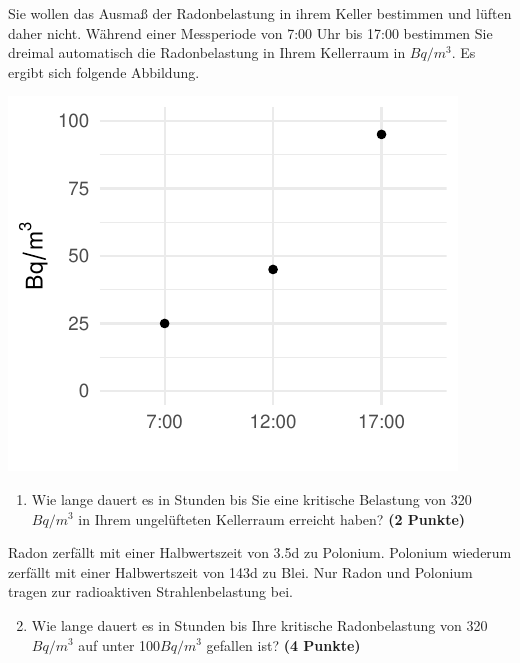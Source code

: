 \documentclass[a4paper, 9pt]{scrartcl}\usepackage[]{graphicx}\usepackage[]{xcolor}
\makeatletter
\def\maxwidth{ %
  \ifdim\Gin@nat@width>\linewidth
    \linewidth
  \else
    \Gin@nat@width
  \fi
}
\newenvironment{knitrout}{}{} %
\makeatother
\begin{document}
Sie wollen das Ausma{\ss} der Radonbelastung in ihrem Keller bestimmen und
l{\"u}ften daher nicht. W{\"a}hrend einer Messperiode von 7:00 Uhr bis
17:00 bestimmen Sie dreimal automatisch die Radonbelastung in
Ihrem Kellerraum in $Bq/m^3$. Es ergibt sich folgende Abbildung.

\begin{knitrout}
\color{fgcolor}

{\centering \includegraphics[width=\maxwidth]{img/math-10-1} 

}


\end{knitrout}

\vspace{-0.75cm}

\begin{enumerate}
\item Wie lange dauert es in Stunden bis Sie eine kritische Belastung von
  320$Bq/m^3$ in Ihrem ungel{\"u}fteten Kellerraum erreicht haben?
  \textbf{(2 Punkte)}
\end{enumerate}

Radon zerf{\"a}llt mit einer Halbwertszeit von 3.5d zu
Polonium. Polonium wiederum zerf{\"a}llt mit einer Halbwertszeit von
143d zu Blei. Nur Radon und Polonium tragen zur
radioaktiven Strahlenbelastung bei.

\begin{enumerate}
  \setcounter{enumi}{1}
\item Wie lange dauert es in Stunden bis Ihre kritische Radonbelastung von
  320$Bq/m^3$ auf unter 100$Bq/m^3$ gefallen ist?
  \textbf{(4 Punkte)}
\end{enumerate}
\end{document}
